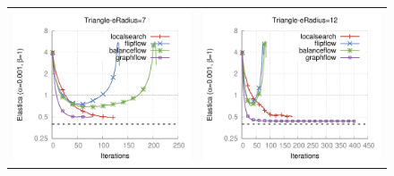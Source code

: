 \begin{figure}
\begin{tabular}{cc}
\includegraphics[scale=0.4]{figures/chapter9/free-elastica/plots/iteration/radius_choice/len_pen_0.001/radius-7/triangle.pdf} & 
\includegraphics[scale=0.4]{figures/chapter9/free-elastica/plots/iteration/radius_choice/len_pen_0.001/radius-12/triangle.pdf}\\[1em] 

\end{tabular}
\end{figure}
